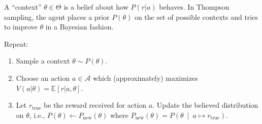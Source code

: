 \documentclass[a0,portrait]{a0poster}
\newcommand{\true}{{\textrm{true}}}
\newcommand{\rmnew}{{\textrm{new}}}
\newcommand{\Acal}{\mathcal{A}}
\newcommand{\pn}[1]{\left( #1 \right)}
\newcommand{\bkt}[1]{\left[ #1 \right]}
\newcommand{\Ebkt}[2][]{\mathbb{E}_{#1}\bkt{#2}}
\newcommand{\mvert}{\ \middle\vert\ }
\begin{document}
\begin{multicols}{2}
A ``context'' $\theta \in \Theta$ is a belief about how $P(r|a)$ behaves.  In Thompson sampling, the agent places a prior $P(\theta)$ on the set of possible contexts and tries to improve $\theta$ in a Bayesian fashion.

Repeat:
\begin{enumerate}
 \item Sample a context $\theta \sim P(\theta)$.
 \item Choose an action $a \in \Acal$ which (approximately) maximizes $V(a|\theta) = \Ebkt{r|a,\theta}$.
 \item\label{itm:Thompson-conditioning}
    Let $r_\true$ be the reward received for action $a$.
    Update the believed distribution on $\theta$, i.e., $P(\theta) \gets P_\rmnew(\theta)$ where $P_\rmnew(\theta) = P\pn{\theta \mvert a \mapsto r_\true}$.
\end{enumerate}

\newpage

\end{multicols}
\end{document}
